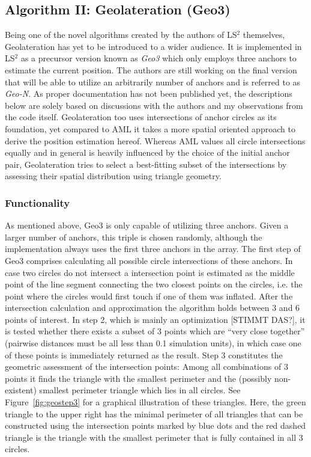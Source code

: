 \subsection{Algorithm II: Geolateration (Geo3)}
Being one of the novel algorithms created by the authors of LS$^{2}$ themselves, Geolateration has yet to be introduced to a wider audience. It is implemented in LS$^{2}$ as a precursor version known as \emph{Geo3} which only employs three anchors to estimate the current position. The authors are still working on the final version that will be able to utilize an arbitrarily number of anchors and is referred to as \emph{Geo-N}. As proper documentation has not been published yet, the descriptions below are solely based on discussions with the authors and my observations from the code itself. Geolateration too uses intersections of anchor circles as its foundation, yet compared to AML it takes a more spatial oriented approach to derive the position estimation hereof. Whereas AML values all circle intersections equally and in general is heavily influenced by the choice of the initial anchor pair, Geolateration tries to select a best-fitting subset of the intersections by assessing their spatial distribution using triangle geometry.

\subsubsection{Functionality}
As mentioned above, Geo3 is only capable of utilizing three anchors. Given a larger number of anchors, this triple is chosen randomly, although the implementation always uses the first three anchors in the array. The first step of Geo3 comprises calculating all possible circle intersections of these anchors. In case two circles do not intersect a intersection point is estimated as the middle point of the line segment connecting the two closest points on the circles, i.e. the point where the circles would first touch if one of them was inflated. After the intersection calculation and approximation the algorithm holds between 3 and 6 points of interest. In step 2, which is mainly an optimization [STIMMT DAS?], it is tested whether there exists a subset of 3 points which are ``very close together'' (pairwise distances must be all less than 0.1 simulation units), in which case one of these points is immediately returned as the result. Step 3 constitutes the geometric assessment of the intersection points: Among all combinations of 3 points it finds the triangle with the smallest perimeter and the (possibly non-existent) smallest perimeter triangle which lies in all circles. See Figure~\ref{fig:geostep3} for a graphical illustration of these triangles. Here, the green triangle to the upper right has the minimal perimeter of all triangles that can be constructed using the intersection points marked by blue dots and the red dashed triangle is the triangle with the smallest perimeter that is fully contained in all 3 circles.

